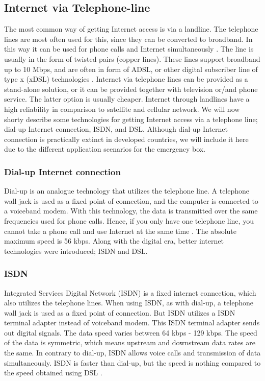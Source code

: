 \subsection{Internet via Telephone-line}
The most common way of getting Internet access is via a landline. The telephone lines are most often used for this, since they can be converted to broadband. In this way it can be used for phone calls and Internet simultaneously \cite{internet}. The line is usually in the form of twisted pairs (copper lines). These lines support broadband up to 10 Mbps, and are often in form of ADSL, or other digital subscriber line of type x (xDSL) technologies \citep{audestad}. Internet via telephone lines can be provided as a stand-alone solution, or it can be provided together with television or/and phone service. The latter option is usually cheaper. Internet through landlines have a high reliability \cite{cablevssatellite} in comparison to satellite and cellular network. We will now shorty describe some technologies for getting Internet access via a telephone line; dial-up Internet connection, ISDN, and DSL. Although dial-up Internet connection is practically extinct in developed countries, we will include it here due to the different application scenarios for the emergency box. 

\subsubsection{Dial-up Internet connection}
Dial-up is an analogue technology that utilizes the telephone line. A telephone wall jack is used as a fixed point of connection, and the computer is connected to a voiceband modem. With this technology, the data is transmitted over the same frequencies used for phone calls. Hence, if you only have one telephone line, you cannot take a phone call and use Internet at the same time \cite{differentuplinks}. The absolute maximum speed is 56 kbps. Along with the digital era, better internet technologies were introduced; ISDN and DSL. 

\subsubsection{ISDN}
Integrated Services Digital Network (ISDN) is a fixed internet connection, which also utilizes the telephone lines. When using ISDN, as with dial-up, a telephone wall jack is used as a fixed point of connection. But ISDN utilizes a ISDN terminal adapter instead of voiceband modem. This ISDN terminal adapter sends out digital signals. The data speed varies between 64 kbps - 129 kbps. The speed of the data is symmetric, which means upstream and downstream data rates are the same. In contrary to dial-up, ISDN allows voice calls and transmission of data simultaneously. ISDN is faster than dial-up, but the speed is nothing compared to the speed obtained using DSL \cite{differentuplinks}. 

